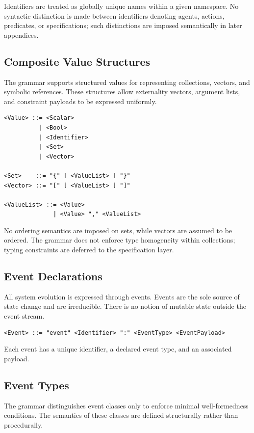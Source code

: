 \documentclass[11pt,oneside]{article}
\begin{document}
Identifiers are treated as globally unique names within a given namespace. No syntactic distinction is made between identifiers denoting agents, actions, predicates, or specifications; such distinctions are imposed semantically in later appendices.

\subsection{Composite Value Structures}

The grammar supports structured values for representing collections, vectors, and symbolic references. These structures allow externality vectors, argument lists, and constraint payloads to be expressed uniformly.

\begin{verbatim}
<Value> ::= <Scalar>
          | <Bool>
          | <Identifier>
          | <Set>
          | <Vector>

<Set>    ::= "{" [ <ValueList> ] "}"
<Vector> ::= "[" [ <ValueList> ] "]"

<ValueList> ::= <Value>
              | <Value> "," <ValueList>
\end{verbatim}

No ordering semantics are imposed on sets, while vectors are assumed to be ordered. The grammar does not enforce type homogeneity within collections; typing constraints are deferred to the specification layer.

\subsection{Event Declarations}

All system evolution is expressed through events. Events are the sole source of state change and are irreducible. There is no notion of mutable state outside the event stream.

\begin{verbatim}
<Event> ::= "event" <Identifier> ":" <EventType> <EventPayload>
\end{verbatim}

Each event has a unique identifier, a declared event type, and an associated payload.

\subsection{Event Types}

The grammar distinguishes event classes only to enforce minimal well-formedness conditions. The semantics of these classes are defined structurally rather than procedurally.
\end{document}

